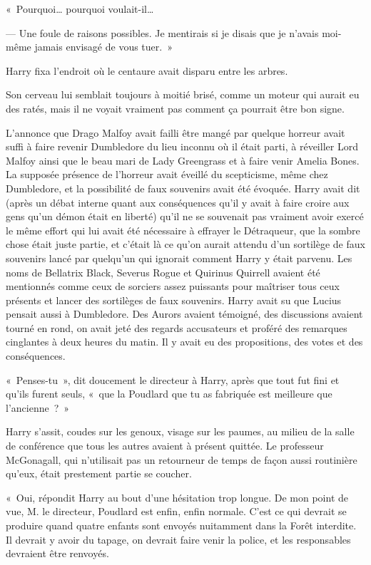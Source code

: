 «~Pourquoi… pourquoi voulait-il…

--- Une foule de raisons possibles.
Je mentirais si je disais que je n'avais moi-même jamais envisagé de vous tuer.~»

Harry fixa l'endroit où le centaure avait disparu entre les arbres.

Son cerveau lui semblait toujours à moitié brisé, comme un moteur qui aurait eu des ratés, mais il ne voyait vraiment pas comment ça pourrait être bon signe.

\later

L'annonce que Drago Malfoy avait failli être mangé par quelque horreur avait suffi à faire revenir Dumbledore du lieu inconnu où il était parti, à réveiller Lord Malfoy ainsi que le beau mari de Lady Greengrass et à faire venir Amelia Bones.
La supposée présence de l'horreur avait éveillé du scepticisme, même chez Dumbledore, et la possibilité de faux souvenirs avait été évoquée.
Harry avait dit (après un débat interne quant aux conséquences qu'il y avait à faire croire aux gens qu'un démon était en liberté) qu'il ne se souvenait pas vraiment avoir exercé le même effort qui lui avait été nécessaire à effrayer le Détraqueur, que la sombre chose était juste partie, et c'était là ce qu'on aurait attendu d'un sortilège de faux souvenirs lancé par quelqu'un qui ignorait comment Harry y était parvenu.
Les noms de Bellatrix Black, Severus Rogue et Quirinus Quirrell avaient été mentionnés comme ceux de sorciers assez puissants pour maîtriser tous ceux présents et lancer des sortilèges de faux souvenirs.
Harry avait su que Lucius pensait aussi à Dumbledore.
Des Aurors avaient témoigné, des discussions avaient tourné en rond, on avait jeté des regards accusateurs et proféré des remarques cinglantes à deux heures du matin.
Il y avait eu des propositions, des votes et des conséquences.

«~Penses-tu~», dit doucement le directeur à Harry, après que tout fut fini et qu'ils furent seuls, «~que la Poudlard que tu as fabriquée est meilleure que l'ancienne~?~»

Harry s'assit, coudes sur les genoux, visage sur les paumes, au milieu de la salle de conférence que tous les autres avaient à présent quittée.
Le professeur McGonagall, qui n'utilisait pas un retourneur de temps de façon aussi routinière qu'eux, était prestement partie se coucher.

«~Oui, répondit Harry au bout d'une hésitation trop longue.
De mon point de vue, M. le directeur, Poudlard est enfin, enfin normale.
C'est ce qui devrait se produire quand quatre enfants sont envoyés nuitamment dans la Forêt interdite.
Il devrait y avoir du tapage, on devrait faire venir la police, et les responsables devraient être renvoyés.

